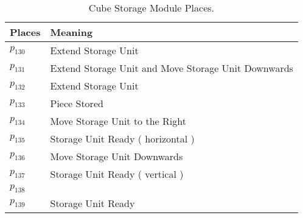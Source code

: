 \begin{table}[H]
\caption{Cube Storage Module Places.}
\centering
\begin{tabular}{M{5cm}M{10cm}}
Places & Meaning\\
\hline
\hyperlink{partialNet:p1301}{\hypertarget{partialTable:p130}{$p_{130}$}} & Extend Storage Unit\\
\hyperlink{partialNet:p1311}{\hypertarget{partialTable:p131}{$p_{131}$}} & Extend Storage Unit and Move Storage Unit Downwards\\
\hyperlink{partialNet:p1321}{\hypertarget{partialTable:p132}{$p_{132}$}} & Extend Storage Unit\\
\hyperlink{partialNet:p1331}{\hypertarget{partialTable:p133}{$p_{133}$}} & Piece Stored\\
\hyperlink{partialNet:p1341}{\hypertarget{partialTable:p134}{$p_{134}$}} & Move Storage Unit to the Right\\
\hyperlink{partialNet:p1351}{\hypertarget{partialTable:p135}{$p_{135}$}} & Storage Unit Ready ( horizontal )\\
\hyperlink{partialNet:p1361}{\hypertarget{partialTable:p136}{$p_{136}$}} & Move Storage Unit Downwards\\
\hyperlink{partialNet:p1371}{\hypertarget{partialTable:p137}{$p_{137}$}} & Storage Unit Ready ( vertical )\\
\hyperlink{partialNet:p1381}{\hypertarget{partialTable:p138}{$p_{138}$}} & \\
\hyperlink{partialNet:p1391}{\hypertarget{partialTable:p139}{$p_{139}$}} & Storage Unit Ready\\
\end{tabular}
\end{table}
